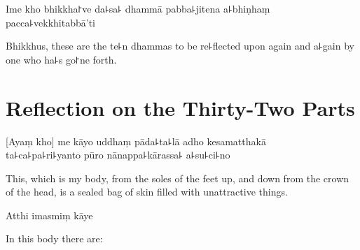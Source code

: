 Ime kho bhikkha꜓ve da꜕sa꜕ dhammā pabba꜕jitena a꜕bhiṇhaṃ pacca꜕vekkhitabbā'ti

\begin{english}
  Bhikkhus, these are the te꜕n dhammas to be re꜕flected upon again and a꜕gain by one who ha꜕s go꜓ne forth.
\end{english}

\chapter[Thirty-Two Parts]{Reflection on the Thirty-Two Parts}%


\begin{leader}
\end{leader}

[Ayaṃ kho] me kāyo uddhaṃ pāda꜕ta꜕lā adho kesamatthakā\\
ta꜕ca꜕pa꜕ri꜕yanto pūro nānappa꜕kārassa꜕ a꜕su꜕ci꜕no

\begin{english}
  This, which is my body, from the soles of the feet up, and down from the crown of the head, is a sealed bag of skin filled with unattractive things.
\end{english}

Atthi imasmiṃ kāye

\begin{english}
  In this body there are:
\end{english}


